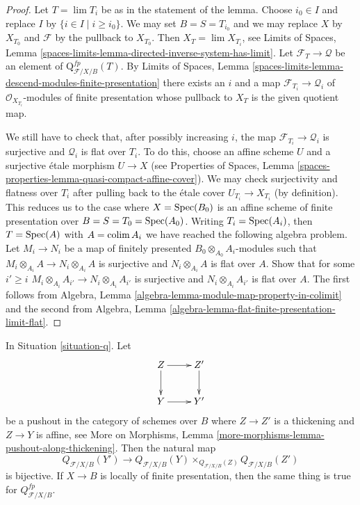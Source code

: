 \begin{proof}
Let $T = \lim T_i$ be as in the statement of the lemma.
Choose $i_0 \in I$ and replace $I$ by $\{i \in I \mid i \geq i_0\}$.
We may set $B = S = T_{i_0}$ and we may replace $X$ by $X_{T_0}$
and $\mathcal{F}$ by the pullback to $X_{T_0}$. Then
$X_T = \lim X_{T_i}$, see
Limits of Spaces, Lemma
\ref{spaces-limits-lemma-directed-inverse-system-has-limit}.
Let $\mathcal{F}_T \to \mathcal{Q}$ be an element of
$\text{Q}^{fp}_{\mathcal{F}/X/B}(T)$. By
Limits of Spaces, Lemma
\ref{spaces-limits-lemma-descend-modules-finite-presentation}
there exists an $i$ and a map $\mathcal{F}_{T_i} \to \mathcal{Q}_i$
of $\mathcal{O}_{X_{T_i}}$-modules of finite presentation whose
pullback to $X_T$ is the given quotient map.

\medskip\noindent
We still have to check that, after possibly increasing $i$, the map
$\mathcal{F}_{T_i} \to \mathcal{Q}_i$ is surjective and $\mathcal{Q}_i$
is flat over $T_i$. To do this, choose an affine scheme $U$ and a
surjective \'etale morphism $U \to X$ (see Properties of Spaces,
Lemma \ref{spaces-properties-lemma-quasi-compact-affine-cover}).
We may check surjectivity and flatness over $T_i$ after pulling
back to the \'etale cover $U_{T_i} \to X_{T_i}$ (by definition).
This reduces us to the case where $X = \mathop{\mathrm{Spec}}(B_0)$ is an affine scheme of
finite presentation over $B = S = T_0 = \mathop{\mathrm{Spec}}(A_0)$.
Writing $T_i = \mathop{\mathrm{Spec}}(A_i)$, then $T = \mathop{\mathrm{Spec}}(A)$ with $A = \mathop{\mathrm{colim}}\nolimits A_i$
we have reached the following algebra problem. Let $M_i \to N_i$
be a map of finitely presented $B_0 \otimes_{A_0} A_i$-modules
such that $M_i \otimes_{A_i} A \to N_i \otimes_{A_i} A$ is surjective
and $N_i \otimes_{A_i} A$ is flat over $A$. Show that for some $i' \geq i$
$M_i \otimes_{A_i} A_{i'} \to N_i \otimes_{A_i} A_{i'}$ is surjective
and $N_i \otimes_{A_i} A_{i'}$ is flat over $A$.
The first follows from
Algebra, Lemma \ref{algebra-lemma-module-map-property-in-colimit}
and the second from
Algebra, Lemma \ref{algebra-lemma-flat-finite-presentation-limit-flat}.
\end{proof}

\begin{lemma}
\label{lemma-q-RS-star}
In Situation \ref{situation-q}. Let
$$
\xymatrix{
Z \ar[r] \ar[d] & Z' \ar[d] \\
Y \ar[r] & Y'
}
$$
be a pushout in the category of schemes over $B$ where
$Z \to Z'$ is a thickening and $Z \to Y$ is affine, see
More on Morphisms, Lemma \ref{more-morphisms-lemma-pushout-along-thickening}.
Then the natural map
$$
Q_{\mathcal{F}/X/B}(Y') \longrightarrow
Q_{\mathcal{F}/X/B}(Y) \times_{Q_{\mathcal{F}/X/B}(Z)} Q_{\mathcal{F}/X/B}(Z')
$$
is bijective. If $X \to B$ is locally of finite presentation, then
the same thing is true for $Q^{fp}_{\mathcal{F}/X/B}$.
\end{lemma}

